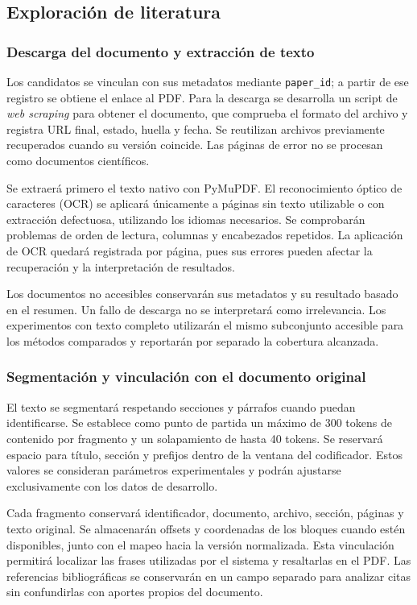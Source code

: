 \documentclass[conference]{IEEEtran}
\begin{document}
\subsection{Exploración de literatura}
\label{subsec:exploracion}

\subsubsection{Descarga del documento y extracción de texto}

Los candidatos se vinculan con sus metadatos mediante \texttt{paper\_id}; a partir de ese registro se obtiene el enlace al PDF. Para la descarga se desarrolla un script de \textit{web scraping} para obtener el documento, que comprueba el formato del archivo y registra URL final, estado, huella y fecha. Se reutilizan archivos previamente recuperados cuando su versión coincide. Las páginas de error no se procesan como documentos científicos.

Se extraerá primero el texto nativo con PyMuPDF. El reconocimiento óptico de caracteres (OCR) se aplicará únicamente a páginas sin texto utilizable o con extracción defectuosa, utilizando los idiomas necesarios. Se comprobarán problemas de orden de lectura, columnas y encabezados repetidos. La aplicación de OCR quedará registrada por página, pues sus errores pueden afectar la recuperación y la interpretación de resultados.

Los documentos no accesibles conservarán sus metadatos y su resultado basado en el resumen. Un fallo de descarga no se interpretará como irrelevancia. Los experimentos con texto completo utilizarán el mismo subconjunto accesible para los métodos comparados y reportarán por separado la cobertura alcanzada.

\subsubsection{Segmentación y vinculación con el documento original}

El texto se segmentará respetando secciones y párrafos cuando puedan identificarse. Se establece como punto de partida un máximo de 300 tokens de contenido por fragmento y un solapamiento de hasta 40 tokens. Se reservará espacio para título, sección y prefijos dentro de la ventana del codificador. Estos valores se consideran parámetros experimentales y podrán ajustarse exclusivamente con los datos de desarrollo.

Cada fragmento conservará identificador, documento, archivo, sección, páginas y texto original. Se almacenarán offsets y coordenadas de los bloques cuando estén disponibles, junto con el mapeo hacia la versión normalizada. Esta vinculación permitirá localizar las frases utilizadas por el sistema y resaltarlas en el PDF. Las referencias bibliográficas se conservarán en un campo separado para analizar citas sin confundirlas con aportes propios del documento.
\end{document}
